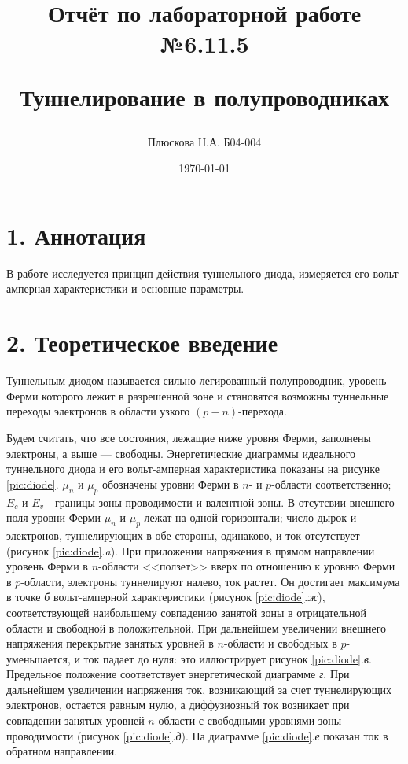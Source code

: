 \documentclass[a4paper,12pt]{report}
\title{Отчёт по лабораторной работе №6.11.5

Туннелирование в полупроводниках}
\author{Плюскова Н.А. Б04-004 }
\date{\today}
\begin{document}
\maketitle

\section*{1. Аннотация}

В работе исследуется принцип действия туннельного диода, измеряется его вольт-амперная характеристики и основные параметры.

\section*{2. Теоретическое введение}

Туннельным диодом называется сильно легированный полупроводник, уровень Ферми которого лежит в разрешенной зоне и становятся возможны туннельные переходы электронов в области узкого $(p-n)$-перехода. 
	
Будем считать, что все состояния, лежащие ниже уровня Ферми, заполнены электроны, а выше --- свободны. Энергетические диаграммы идеального туннельного диода и его вольт-амперная характеристика показаны на рисунке \ref{pic:diode}. $\mu_n$ и $\mu_p$ обозначены уровни Ферми в $n$- и $p$-области соответственно; $E_c$ и $E_v$ - границы зоны проводимости и валентной зоны. В отсутсвии внешнего поля уровни Ферми $\mu_n$ и $\mu_p$ лежат на одной горизонтали; число дырок и электронов, туннелирующих в обе стороны, одинаково, и ток отсутствует (рисунок \ref{pic:diode}.\textit{a}). При приложении напряжения в прямом направлении уровень Ферми в $n$-области <<ползет>> вверх по отношению к уровню Ферми в $p$-области, электроны туннелируют налево, ток растет. Он достигает максимума в точке \textit{б} вольт-амперной характеристики (рисунок \ref{pic:diode}.\textit{ж}), соответствующей наибольшему совпадению занятой зоны в отрицательной области и свободной в положительной. При дальнейшем увеличении внешнего напряжения перекрытие занятых уровней в $n$-области и свободных в $p$- уменьшается, и ток падает до нуля: это иллюстрирует рисунок \ref{pic:diode}.\textit{в}. Предельное положение соответствует энергетической диаграмме \textit{г}. При дальнейшем увеличении напряжения ток, возникающий за счет туннелирующих электронов, остается равным нулю, а диффузиозный ток возникает при совпадении занятых уровней $n$-области с свободными уровнями зоны проводимости (рисунок \ref{pic:diode}.\textit{д}). На диаграмме \ref{pic:diode}.\textit{е} показан ток в обратном направлении. 
	
\end{document}
